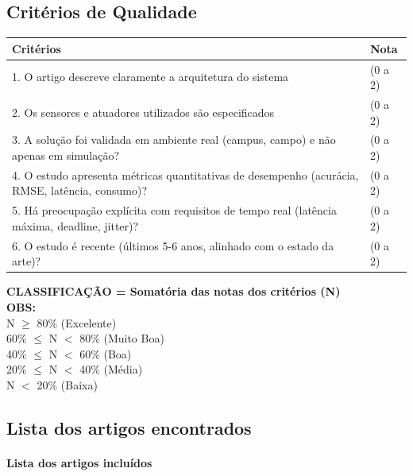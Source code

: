 \vspace{0.5cm}
\subsection{Critérios de Qualidade}

\begin{table}[ht]
\centering
\begin{tabular}{|p{10cm}|p{4cm}|}
\hline
\textbf{Critérios} & \textbf{Nota} \\
\hline
1. O artigo descreve claramente a arquitetura do sistema& (0 a 2) \\
\hline
2. Os sensores e atuadores utilizados são especificados & (0 a 2) \\
\hline
3. A solução foi validada em ambiente real (campus, campo) e não apenas em simulação? & (0 a 2) \\
\hline
4. O estudo apresenta métricas quantitativas de desempenho (acurácia, RMSE, latência, consumo)? & (0 a 2) \\
\hline
5. Há preocupação explícita com requisitos de tempo real (latência máxima, deadline, jitter)? & (0 a 2) \\
\hline
6. O estudo é recente (últimos 5-6 anos, alinhado com o estado da arte)? & (0 a 2) \\
\hline
\hline
\end{tabular}
\end{table}

\noindent \textbf{CLASSIFICAÇÃO = Somatória das notas dos critérios (N)} \\
\textbf{OBS:} \\
N $\geq$ 80\% (Excelente) \\
60\% $\le$ N $<$ 80\% (Muito Boa) \\
40\% $\le$ N $<$ 60\% (Boa) \\
20\% $\le$ N $<$ 40\% (Média) \\
N $<$ 20\% (Baixa)

\subsection{Lista dos artigos encontrados}
\paragraph*{Lista dos artigos incluídos}

